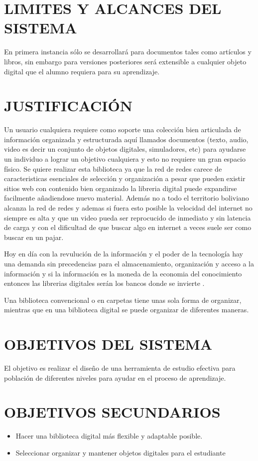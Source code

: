 \section*{LIMITES Y ALCANCES DEL SISTEMA}
En primera instancia sólo se desarrollará para documentos tales como artículos y libros, sin embargo para versiones posteriores será extensible a cualquier objeto digital que el alumno requiera para su aprendizaje. 

\section*{JUSTIFICACIÓN}
Un usuario cualquiera requiere como soporte una colección bien articulada de información organizada y estructurada aquí llamados documentos (texto, audio, video es decir un conjunto de objetos digitales, simuladores, etc) para ayudarse un individuo a lograr un objetivo cualquiera y esto no requiere un gran espacio físico. Se quiere realizar esta biblioteca ya que la red de redes carece de caracteristicas esenciales de selección y organización a pesar que pueden existir sitios web con contenido bien organizado la libreria digital puede expandirse facilmente añadiendose nuevo material. Además no a todo el territorio boliviano alcanza la red de redes y ademas si fuera esto posible la velocidad del internet no siempre es alta y que un video pueda ser reprocucido de inmediato y sin latencia de carga y con el dificultad de que buscar algo en internet a veces suele ser como buscar en un pajar. 

Hoy en día con la revulución de la información y el poder de la tecnología hay una demanda sin precedencias para el almacenamiento, organización y acceso a la información y si la información es la moneda de la economia del conocimiento entonces las librerias digitales serán los bancos donde se invierte \cite{91364001}. 

Una biblioteca convencional o en carpetas tiene unas sola forma de organizar, mientras que en una biblioteca digital se puede organizar de diferentes maneras. 

\section*{OBJETIVOS DEL SISTEMA}
El objetivo es realizar el diseño de una herramienta de estudio efectiva para población de diferentes niveles para ayudar en el  proceso de aprendizaje.  
\section*{OBJETIVOS SECUNDARIOS}
\begin{itemize}
	\item Hacer una biblioteca digital más flexible y adaptable posible.
	\item Seleccionar organizar y mantener objetos digitales para el estudiante
\end{itemize}


